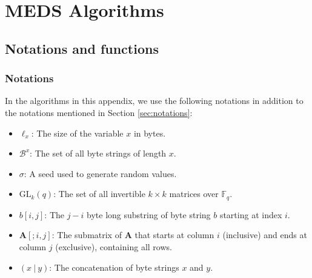 \chapter{MEDS Algorithms}
\label{app:medsalgs}

\section{Notations and functions}

\subsection{Notations}
In the algorithms in this appendix, we use the following notations in addition to the notations mentioned in Section \ref{sec:notations}:
\begin{itemize}
  \item $\ell_{x}$: The size of the variable $x$ in bytes.
  \item $\mathcal{B}^{x}$: The set of all byte strings of length $x$.
  \item $\sigma$: A seed used to generate random values.
  \item $\text{GL}_k(q)$: The set of all invertible $k \times k$ matrices over $\mathds{F}_q$.
  \item $b[i,j]$: The $j-i$ byte long substring of byte string $b$ starting at index $i$.
  \item $\textbf{A}[;i,j]$: The submatrix of $\textbf{A}$ that starts at column $i$ (inclusive) and ends at column $j$ (exclusive), containing all rows.
  \item $(x~|~y)$: The concatenation of byte strings $x$ and $y$.
\end{itemize}

